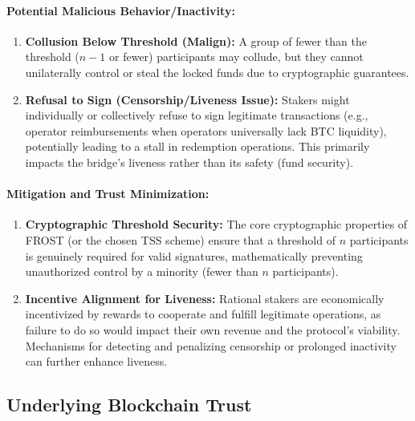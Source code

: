 \documentclass{DESSThesis}
\begin{document}
\paragraph{Potential Malicious Behavior/Inactivity:}
    \begin{enumerate}
        \item \textbf{Collusion Below Threshold (Malign):} A group of fewer than the threshold ($n-1$ or fewer) participants may collude, but they cannot unilaterally control or steal the locked funds due to cryptographic guarantees.

        \item \textbf{Refusal to Sign (Censorship/Liveness Issue):} Stakers might individually or collectively refuse to sign legitimate transactions (e.g., operator reimbursements when operators universally lack BTC liquidity), potentially leading to a stall in redemption operations. This primarily impacts the bridge's liveness rather than its safety (fund security).
    \end{enumerate}

\paragraph{Mitigation and Trust Minimization:}
    \begin{enumerate}
        \item \textbf{Cryptographic Threshold Security:} The core cryptographic properties of FROST (or the chosen TSS scheme) ensure that a threshold of $n$ participants is genuinely required for valid signatures, mathematically preventing unauthorized control by a minority (fewer than $n$ participants).
        \item \textbf{Incentive Alignment for Liveness:} Rational stakers are economically incentivized by rewards to cooperate and fulfill legitimate operations, as failure to do so would impact their own revenue and the protocol's viability. Mechanisms for detecting and penalizing censorship or prolonged inactivity can further enhance liveness.
    \end{enumerate}



\subsection{Underlying Blockchain Trust}
\end{document}
